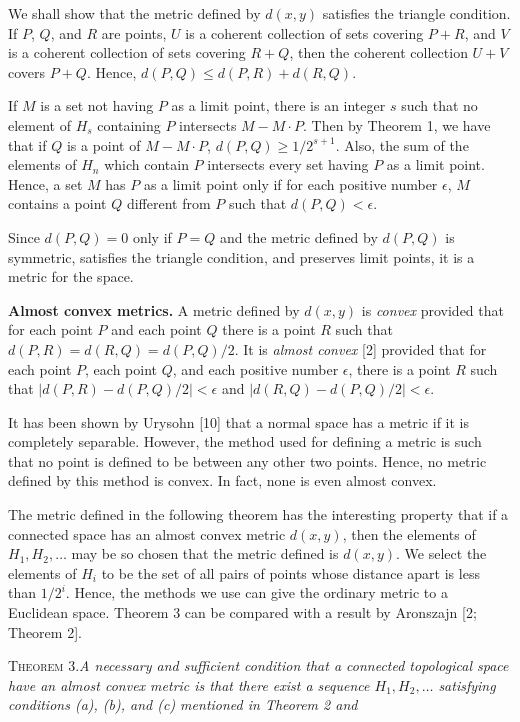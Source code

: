 \documentclass[11pt,a4paper,leqno,twoside]{article}
\newcommand{\heading}[1]{\par\medskip\noindent\textbf{#1}\enspace}
\newcommand{\thm}[2]{\par\medskip\noindent\textsc{Theorem #1.}\enspace\textit{#2}\par}
\begin{document}
We shall show that the metric defined by $d(x,y)$ satisfies the triangle condition. If $P$, $Q$, and $R$ are points, $U$ is a coherent collection of sets covering $P+R$, and $V$ is a coherent collection of sets covering $R+Q$, then the coherent collection $U+V$ covers $P+Q$. Hence, $d(P,Q)\leq d(P,R)+d(R,Q)$.

If $M$ is a set not having $P$ as a limit point, there is an integer $s$ such that no element of $H_s$ containing $P$ intersects $M-M\cdot P$. Then by Theorem 1, we have that if $Q$ is a point of $M-M\cdot P$, $d(P,Q)\geq1/2^{s+1}$. Also, the sum of the elements of $H_n$ which contain $P$ intersects every set having $P$ as a limit point. Hence, a set $M$ has $P$ as a limit point only if for each positive number $\epsilon$, $M$ contains a point $Q$ different from $P$ such that $d(P,Q)<\epsilon$.

Since $d(P,Q)=0$ only if $P=Q$ and the metric defined by $d(P,Q)$ is symmetric, satisfies the triangle condition, and preserves limit points, it is a metric for the space.

\heading{Almost convex metrics.} A metric defined by $d(x,y)$ is \textit{convex} provided that for each point $P$ and each point $Q$ there is a point $R$ such that $d(P,R)=d(R,Q)=d(P,Q)/2$. It is \textit{almost convex} [2] provided that for each point $P$, each point $Q$, and each positive number $\epsilon$, there is a point $R$ such that $|d(P,R)-d(P,Q)/2|<\epsilon$ and $|d(R,Q)-d(P,Q)/2|<\epsilon$.

It has been shown by Urysohn [10] that a normal space has a metric if it is completely separable. However, the method used for defining a metric is such that no point is defined to be between any other two points. Hence, no metric defined by this method is convex. In fact, none is even almost convex.

The metric defined in the following theorem has the interesting property that if a connected space has an almost convex metric $d(x,y)$, then the elements of $H_1,H_2,\ldots$ may be so chosen that the metric defined is $d(x,y)$. We select the elements of $H_i$ to be the set of all pairs of points whose distance apart is less than $1/2^i$. Hence, the methods we use can give the ordinary metric to a Euclidean space. Theorem 3 can be compared with a result by Aronszajn [2; Theorem 2].

\thm{3}{A necessary and sufficient condition that a connected topological space have an almost convex metric is that there exist a sequence $H_1,H_2,\ldots$ satisfying conditions (a), (b), and (c) mentioned in Theorem 2 and}
\end{document}
